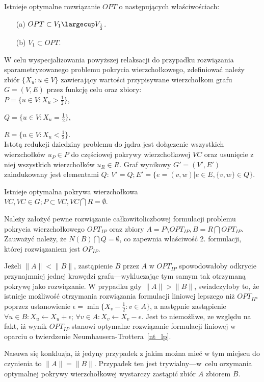 \begin{nt}
  Istnieje optymalne rozwiązanie $OPT$ o następujących właściwościach:
  \begin{itemize}
    \item[(a)] $OPT \subset V_1 \largecup V_{\frac{1}{2}}$.
    \item[(b)] $V_1 \subset OPT$.
  \end{itemize}
\end{nt}

W celu wyspecjalizowania powyższej relaksacji do przypadku rozwiązania
sparametryzowanego problemu pokrycia wierzchołkowego, zdefiniować należy zbiór 
$\{ X_u : u \in V \}$ zawierający wartości przypisywane wierzchołkom grafu 
$G=(V,E)$ przez funkcję celu oraz zbiory:\\


$P=\{u \in V : X_u>\frac{1}{2}\}$,\par
$Q=\{u \in V : X_u=\frac{1}{2}\}$,\par
$R=\{u \in V : X_u<\frac{1}{2}\}$.\\


Istotą redukcji dziedziny problemu do jądra jest dołączenie wszystkich
wierzchołków $u_P \in P$ do częściowej pokrywy wierzchołkowej $VC$ oraz 
usunięcie z niej wszystkich wierzchołków $u_R \in R$.
Graf wynikowy $G\prime=(V\prime, E\prime)$ zaindukowany jest elementami $Q$: 
$V\prime=Q; E\prime=\{e=(v, w)| e \in E, \{v, w\} \in Q\}$.

\begin{theorem}
  Istnieje optymalna pokrywa wierzchołkowa\\
  ${VC, VC \in G; P \subset VC, VC \bigcap R = \emptyset}$.
\end{theorem}
\begin{bproof}
  Należy założyć pewne rozwiązanie całkowitoliczbowej formulacji problemu 
  pokrycia wierzchołkowego $OPT_{IP}$ oraz zbiory 
  ${A = P \setminus OPT_{IP}, B = R \bigcap OPT_{IP}}$.
  Zauważyć należy, że $N(B) \bigcap Q = \emptyset$, co zapewnia właściwość 2.
  formulacji, której rozwiązaniem jest $OP_{IP}$.


  Jeżeli $\|A\|<\|B\|$, zastąpienie $B$ przez $A$ w $OPT_{IP}$ spowodowałoby
  odkrycie przynajmniej jednej krawędzi grafu---wykluczając tym samym
  tak otrzymaną pokrywę jako rozwiązanie.
  W prypadku gdy $\|A\|>\|B\|$, swiadczyłoby to, że istnieje możliwość
  otrzymania rozwiązania formulacji liniowej lepszego niż $OPT_{IP}$ poprzez
  ustanowienie $\epsilon = \min\{X_v-\frac{1}{2}: v \in A\}$, a następnie
  zastąpienie $\forall{u \in B}:X_u \leftarrow X_u + \epsilon$; 
  $\forall{v \in A}: X_v \leftarrow X_v -\epsilon$.
  Jest to niemożliwe, ze względu na fakt, iż wynik $OPT_{IP}$ stanowi optymalne 
  rozwiązanie formulacji liniowej w oparciu o twierdzenie
  Neumhausera-Trottera~\ref{nt_lp}.

  Nasuwa się konkluzja, iż jedyny przypadek z jakim można mieć w tym miejscu do 
  czynienia to $\|A\|=\|B\|$.
  Przypadek ten jest trywialny---w~celu orzymania optymalnej pokrywy wierzchołkowej 
  wystarczy zastąpić zbiór $A$ zbiorem $B$.
\end{bproof}

